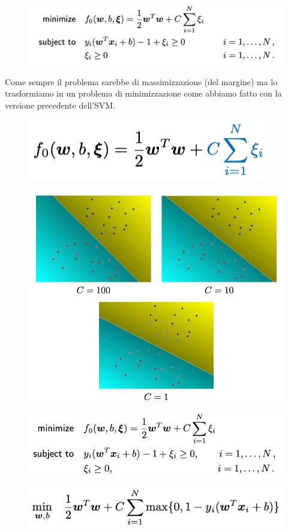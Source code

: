 \documentclass[14pt]{extreport}
\begin{document}
\begin{figure}[H]
	\centering
	\includegraphics[width=0.7\linewidth]{324.jpeg}
\end{figure}

Come sempre il problema sarebbe di massimizzazione (del margine) ma lo trasformiamo in un problema di minimizzazione come abbiamo fatto con la
versione precedente dell'SVM.


\begin{figure}[H]
	\centering
	\includegraphics[width=0.7\linewidth]{325.jpeg}
\end{figure}
\begin{figure}[H]
	\centering
	\includegraphics[width=0.7\linewidth]{326.jpeg}
\end{figure}
\begin{figure}[H]
	\centering
	\includegraphics[width=0.7\linewidth]{327.jpeg}
\end{figure}
\begin{figure}[H]
	\centering
	\includegraphics[width=0.7\linewidth]{328.jpeg}
\end{figure}
\end{document}
